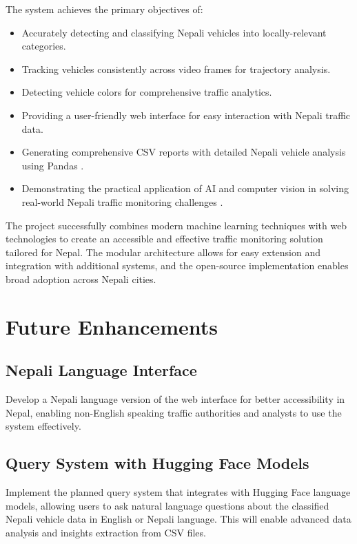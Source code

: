 \documentclass[12pt,a4paper]{report}
\begin{document}
The system achieves the primary objectives of:
\begin{itemize}
    \item Accurately detecting and classifying Nepali vehicles into locally-relevant categories.
    \item Tracking vehicles consistently across video frames for trajectory analysis.
    \item Detecting vehicle colors for comprehensive traffic analytics.
    \item Providing a user-friendly web interface for easy interaction with Nepali traffic data.
    \item Generating comprehensive CSV reports with detailed Nepali vehicle analysis using Pandas \cite{mckinney2010data}.
    \item Demonstrating the practical application of AI and computer vision in solving real-world Nepali traffic monitoring challenges \cite{lecun2015deep}.
\end{itemize}

The project successfully combines modern machine learning techniques with web technologies to create an accessible and effective traffic monitoring solution tailored for Nepal. The modular architecture allows for easy extension and integration with additional systems, and the open-source implementation enables broad adoption across Nepali cities.

\section{Future Enhancements}

\subsection{Nepali Language Interface}
Develop a Nepali language version of the web interface for better accessibility in Nepal, enabling non-English speaking traffic authorities and analysts to use the system effectively.

\subsection{Query System with Hugging Face Models}
Implement the planned query system that integrates with Hugging Face language models, allowing users to ask natural language questions about the classified Nepali vehicle data in English or Nepali language. This will enable advanced data analysis and insights extraction from CSV files.
\end{document}
